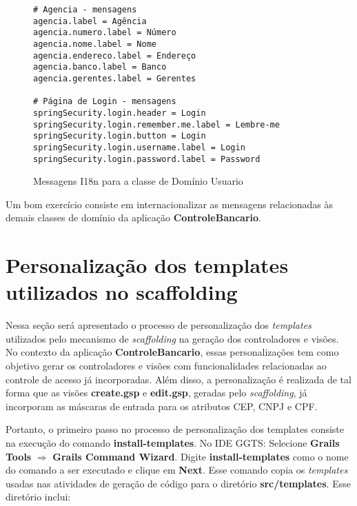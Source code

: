 \begin{figure}[htbp]
\begin{mdframed}
\begin{footnotesize}
\begin{verbatim}
# Agencia - mensagens
agencia.label = Agência
agencia.numero.label = Número
agencia.nome.label = Nome
agencia.endereco.label = Endereço
agencia.banco.label = Banco
agencia.gerentes.label = Gerentes

# Página de Login - mensagens
springSecurity.login.header = Login
springSecurity.login.remember.me.label = Lembre-me
springSecurity.login.button = Login
springSecurity.login.username.label = Login
springSecurity.login.password.label = Password
\end{verbatim}
\end{footnotesize}
\end{mdframed}
\caption{Messagens I18n para a classe de Domínio Usuario}
\label{Agenda18nFig}
\end{figure}

\begin{remark}
Um  bom exercício  consiste em  internacionalizar as  mensagens  relacionadas às
demais classes de domínio da aplicação {\bf ControleBancario}.  
\end{remark}

\section{Personalização dos templates utilizados no scaffolding}

Nessa seção  será apresentado o  processo de personalização dos  {\it templates}
utilizados pelo  mecanismo de {\it  scaffolding} na geração dos  controladores e
visões. No  contexto da aplicação {\bf  ControleBancario}, essas personalizações
tem  como   objetivo  gerar  os  controladores  e   visões  com  funcionalidades
relacionadas ao controle de acesso já incorporadas. Além disso, a personalização
é  realizada de  tal forma  que  as visões  {\bf create.gsp}  e {\bf  edit.gsp},
geradas pelo  {\it scaffolding},  já incorporam as  máscaras de entrada  para os
atributos CEP, CNPJ e CPF.

Portanto, o primeiro passo no  processo de personalização dos templates consiste
na execução  do comando  {\bf install-templates}.  No  IDE GGTS:  Selecione {\bf
  Grails  Tools} $\Longrightarrow$  {\bf  Grails Command  Wizard}.  Digite  {\bf
  install-templates} como  o nome do  comando a ser  executado e clique  em {\bf
  Next}.  Esse comando copia os {\it templates} usadas nas atividades de geração
de  código  para  o  diretório  {\bf  src/templates}.   Esse  diretório  inclui:

